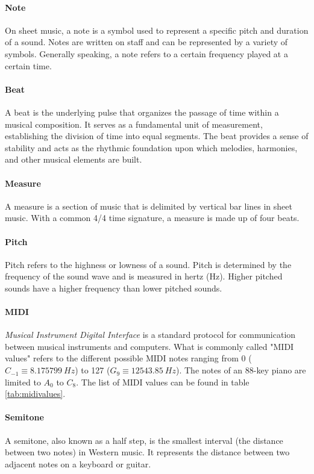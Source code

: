 \paragraph{Note}
On sheet music, a note is a symbol used to represent a specific pitch and duration of a sound. Notes are written on staff and can be represented by a variety of symbols. Generally speaking, a note refers to a certain frequency played at a certain time.

\paragraph{Beat} A beat is the underlying pulse that organizes the passage of time within a musical composition. It serves as a fundamental unit of measurement, establishing the division of time into equal segments. The beat provides a sense of stability and acts as the rhythmic foundation upon which melodies, harmonies, and other musical elements are built.

\paragraph{Measure}
A measure is a section of music that is delimited by vertical bar lines in sheet music. With a common 4/4 time signature, a measure is made up of four beats.

\paragraph{Pitch}
Pitch refers to the highness or lowness of a sound. Pitch is determined by the frequency of the sound wave and is measured in hertz (Hz). Higher pitched sounds have a higher frequency than lower pitched sounds.

\paragraph{MIDI} \textit{Musical Instrument Digital Interface} is a standard protocol for communication between musical instruments and computers. What is commonly called "MIDI values" refers to the different possible MIDI notes ranging from 0 ($C_{-1} \equiv 8.175799\ Hz$) to 127 ($G_{9} \equiv 12543.85\ Hz$)\parencite{MIDIwiki}. The notes of an 88-key piano are limited to $A_0$ to $C_8$. The list of MIDI values can be found in table \ref{tab:midivalues}.

\paragraph{Semitone}
A semitone, also known as a half step, is the smallest interval (the distance between two notes) in Western music. It represents the distance between two adjacent notes on a keyboard or guitar.

